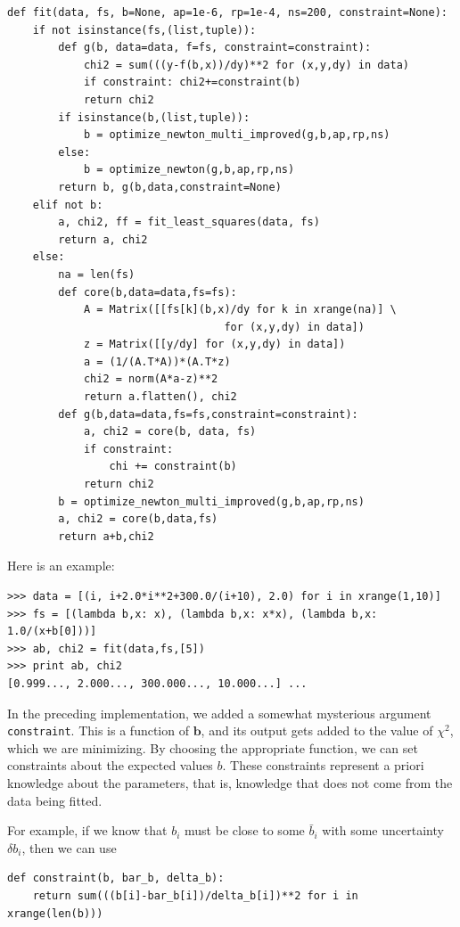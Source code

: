 \documentclass[justified,sixbynine]{tufte-book}
\def\ft{\small\tt}
\theoremstyle{plain}%
\theoremstyle{definition}
\theoremstyle{remark}
\begin{document}
\begin{fullwidth}
\begin{lstlisting}[caption={in file: {\ft nlib.py}}]
def fit(data, fs, b=None, ap=1e-6, rp=1e-4, ns=200, constraint=None):
    if not isinstance(fs,(list,tuple)):
        def g(b, data=data, f=fs, constraint=constraint):
            chi2 = sum(((y-f(b,x))/dy)**2 for (x,y,dy) in data)
            if constraint: chi2+=constraint(b)
            return chi2
        if isinstance(b,(list,tuple)):
            b = optimize_newton_multi_improved(g,b,ap,rp,ns)
        else:
            b = optimize_newton(g,b,ap,rp,ns)
        return b, g(b,data,constraint=None)
    elif not b:
        a, chi2, ff = fit_least_squares(data, fs)
        return a, chi2
    else:
        na = len(fs)
        def core(b,data=data,fs=fs):
            A = Matrix([[fs[k](b,x)/dy for k in xrange(na)] \
                                  for (x,y,dy) in data])
            z = Matrix([[y/dy] for (x,y,dy) in data])
            a = (1/(A.T*A))*(A.T*z)
            chi2 = norm(A*a-z)**2
            return a.flatten(), chi2
        def g(b,data=data,fs=fs,constraint=constraint):
            a, chi2 = core(b, data, fs)
            if constraint:
                chi += constraint(b)
            return chi2
        b = optimize_newton_multi_improved(g,b,ap,rp,ns)
        a, chi2 = core(b,data,fs)
        return a+b,chi2
\end{lstlisting}

Here is an example:

\begin{lstlisting}
>>> data = [(i, i+2.0*i**2+300.0/(i+10), 2.0) for i in xrange(1,10)]
>>> fs = [(lambda b,x: x), (lambda b,x: x*x), (lambda b,x: 1.0/(x+b[0]))]
>>> ab, chi2 = fit(data,fs,[5])
>>> print ab, chi2
[0.999..., 2.000..., 300.000..., 10.000...] ...
\end{lstlisting}


In the preceding implementation, we added a somewhat mysterious argument {\ft constraint}. This is a function of $\mathbf{b}$, and its output gets added to the value of $\chi^2$, which we are minimizing. By choosing the appropriate function, we can set constraints about the expected values $b$. These constraints represent a priori knowledge about the parameters, that is, knowledge that does not come from the data being fitted.

For example, if we know that $b_i$ must be close to some $\bar b_i$ with some uncertainty $\delta b_i$, then we can use
\begin{lstlisting}
def constraint(b, bar_b, delta_b):
    return sum(((b[i]-bar_b[i])/delta_b[i])**2 for i in xrange(len(b)))
\end{lstlisting}


\end{fullwidth}
\end{document}
